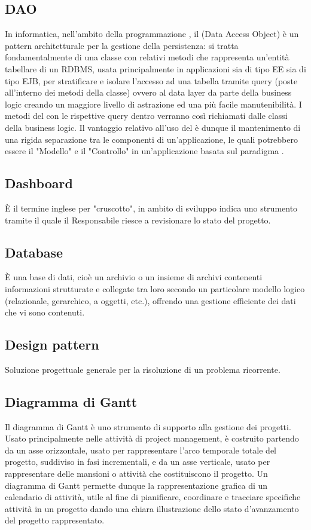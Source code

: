 \subsection*{DAO}
In informatica, nell'ambito della programmazione , il  (Data Access Object) è un pattern architetturale per la gestione della persistenza: si tratta fondamentalmente di una classe con relativi metodi che rappresenta un'entità tabellare di un RDBMS, usata principalmente in applicazioni  sia di tipo  EE sia di tipo EJB, per stratificare e isolare l'accesso ad una tabella tramite query (poste all'interno dei metodi della classe) ovvero al data layer da parte della business logic creando un maggiore livello di astrazione ed una più facile manutenibilità. I metodi del  con le rispettive query dentro verranno così richiamati dalle classi della business logic. Il vantaggio relativo all'uso del  è dunque il mantenimento di una rigida separazione tra le componenti di un'applicazione, le quali potrebbero essere il "Modello" e il "Controllo" in un'applicazione basata sul paradigma .

\subsection*{Dashboard}
È il termine inglese per "cruscotto", in ambito di sviluppo indica uno strumento
tramite il quale il Responsabile riesce a revisionare lo stato del progetto.

\subsection*{Database}
È una base di dati, cioè un archivio o un insieme di archivi contenenti informazioni
strutturate e collegate tra loro secondo un particolare modello logico (relazionale, gerarchico,
a oggetti, etc.), offrendo una gestione efficiente dei dati che vi sono contenuti.

\subsection*{Design pattern}
Soluzione progettuale generale per la risoluzione di un problema ricorrente.

\subsection*{Diagramma di Gantt}
Il diagramma di Gantt è uno strumento di supporto alla gestione dei
progetti. Usato principalmente nelle attività di project management, è costruito partendo da
un asse orizzontale, usato per rappresentare l’arco temporale totale del progetto, suddiviso
in fasi incrementali, e da un asse verticale, usato per rappresentare delle mansioni o attività
che costituiscono il progetto. Un diagramma di Gantt permette dunque la rappresentazione
grafica di un calendario di attività, utile al fine di pianificare, coordinare e tracciare specifiche
attività in un progetto dando una chiara illustrazione dello stato d’avanzamento del progetto
rappresentato.

